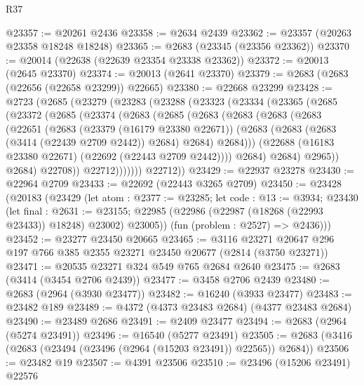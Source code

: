 \begin{lexlean}{R37}
\begin{coremodule}
@23357 := @20261 @2436
@23358 := @2634 @2439
@23362 := @23357 (@20263 @23358 @18248 @18248)
@23365 := @2683 (@23345 (@23356 @23362))
@23370 := @20014 (@22638 (@22639 @23354 @23338 @23362))
@23372 := @20013 (@2645 @23370)
@23374 := @20013 (@2641 @23370)
@23379 := @2683 (@2683 (@22656 (@22658 @23299)) @22665)
@23380 := @22668 @23299
@23428 := @2723
    (@2685
      (@23279
        (@23283
          (@23288
            (@23323
              (@23334
                (@23365
                  (@2685
                    (@23372
                      (@2685
                        (@23374
                          (@2683
                            (@2685
                              (@2683
                                (@2683
                                  (@2683
                                    (@2683
                                      (@22651
                                        (@2683
                                          (@23379 (@16179 @23380 @22671))
                                          (@2683
                                            (@2683 (@2683 (@3414 (@22439 @2709 @2442)) @2684) @2684)
                                            @2684)))
                                      (@22688 (@16183 @23380 @22671) (@22692 (@22443 @2709 @2442))))
                                    @2684)
                                  @2684)
                                @2965))
                            @2684)
                          @22708))
                      @22712)))))))
        @22712))
@23429 := @22937 @23278
@23430 := @22964 @2709
@23433 := @22692 (@22443 @3265 @2709)
@23450 := @23428
    (@20183
      (@23429
        (let atom : @2377 := @23285;
        let code : @13 := @3934;
        @23430
          (let final : @2631 := @23155;
          @22985 (@22986 (@22987 (@18268 (@22993 @23433)) @18248) @23002) @23005))
        (fun (problem : @2527) => @2436)))
@23452 := @23277 @23450 @20665
@23465 := @3116 @23271 @20647 @296 @197 @766 @385 @2355 @23271 @23450 @20677 (@2814 (@3750 @23271))
@23471 := @20535 @23271 @324 @549 @765 @2684 @2640
@23475 := @2683 (@3414 (@3454 @2706 @2439))
@23477 := @3458 @2706 @2439
@23480 := @2683 (@2964 (@3930 @23477))
@23482 := @16240 (@3933 @23477)
@23483 := @23482 @189
@23489 := @4372 (@4373 @23483 @2684) (@4377 @23483 @2684)
@23490 := @23489 @2686
@23491 := @2409 @23477
@23494 := @2683 (@2964 (@5274 @23491))
@23496 := @16540 (@5277 @23491)
@23505 := @2683 (@3416 (@2683 (@23494 (@23496 (@2964 (@15203 @23491)) @22565)) @2684))
@23506 := @23482 @19
@23507 := @4391 @23506
@23510 := @23496 (@15206 @23491) @22576

\end{coremodule}
\end{lexlean}
